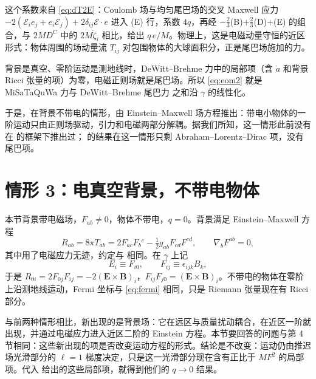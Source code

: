 \documentclass[11pt,a4paper]{ctexart}
\numberwithin{equation}{section}
\begin{document}
这个系数来自 \eqref{eq:dT2E}：Coulomb 场与均匀尾巴场的交叉 Maxwell 应力 $-2(\mathcal E_ie_j+e_i\mathcal E_j)+2\delta_{ij}\mathcal E\!\cdot e$ 进入 (E) 行，系数 $4q$，再经 $-\tfrac23$(B)$+\tfrac23$(D)$+$(E) 的组合，与 $2MD^C$ 中的 $2M\ddot\zeta_i$ 相比，给出 $q\,e/M$。物理上，这是电磁动量守恒的近区形式：物体周围的场动量流 $T_{ij}$ 对包围物体的大球面积分，正是尾巴场施加的力。

背景是真空、零阶运动是测地线时，DeWitt--Brehme 力中的局部项（含 $\dot a$ 和背景 Ricci 张量的项）为零，电磁正则场就是尾巴场。所以 \eqref{eq:eom2} 就是 MiSaTaQuWa 力与 DeWitt--Brehme 尾巴力 \citep{DeWittBrehme1960,Hobbs1968} 之和沿 $\gamma$ 的线性化。

于是，在背景不带电的情形，由 Einstein--Maxwell 场方程推出：带电小物体的一阶运动只由正则场驱动，引力和电磁两部分解耦。据我们所知，这一情形此前没有在 \citet{GrallaWald2008} 的框架下推出过；\citet{FutamaseHoganItoh2008} 的结果在这一情形只剩 Abraham--Lorentz--Dirac 项，没有尾巴项。

\section{情形 3：电真空背景，不带电物体}
\label{sec:L3}

本节背景带电磁场，$F_{ab}\neq0$，物体不带电，$q=0$。背景满足 Einstein--Maxwell 方程
\begin{equation}
R_{ab}=8\pi T_{ab}=2F_{ac}F_b{}^c-\tfrac12g_{ab}F_{cd}F^{cd},\qquad \nabla_bF^{ab}=0,
\label{eq:bgEM}
\end{equation}
其中用了电磁应力无迹，约定与 \citet{ZimmermanPoisson2014} 相同。在 $\gamma$ 上记
\begin{equation}
E_i\equiv F_{i0},\qquad F_{ij}\equiv\epsilon_{ijk}B_k ,
\end{equation}
于是 $R_{0i}=2F_{0j}F_{ij}=-2(\boldsymbol E\times\boldsymbol B)_i$，$F_{ij}F_{j0}=(\boldsymbol E\times\boldsymbol B)_i$。不带电的物体在零阶上沿测地线运动，Fermi 坐标与 \eqref{eq:fermi} 相同，只是 Riemann 张量现在有 Ricci 部分。

与前两种情形相比，新出现的是背景场：它在远区与质量扰动耦合，在近区一阶就出现，并通过电磁应力进入近区二阶的 Einstein 方程。本节要回答的问题与第 4 节相同：这些新出现的项是否改变运动方程的形式。结论是不改变：运动仍由推迟场光滑部分的 $\ell=1$ 梯度决定，只是这一光滑部分现在含有正比于 $MF^2$ 的局部项。代入 \citet{ZimmermanPoisson2014} 给出的这些局部项，就得到他们的 $q\to0$ 结果。
\end{document}
